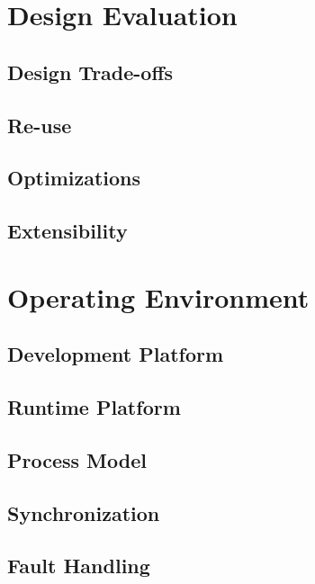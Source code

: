\documentclass{report}
\begin{document}
\chapter{Design Evaluation} %
\label{ch:design-evaluation}

\section{Design Trade-offs}

\section{Re-use}

\section{Optimizations}

\section{Extensibility}

\chapter{Operating Environment} %
\label{ch:operating-environment}

\section{Development Platform}

\section{Runtime Platform}

\section{Process Model}

\section{Synchronization}

\section{Fault Handling}
\end{document}
